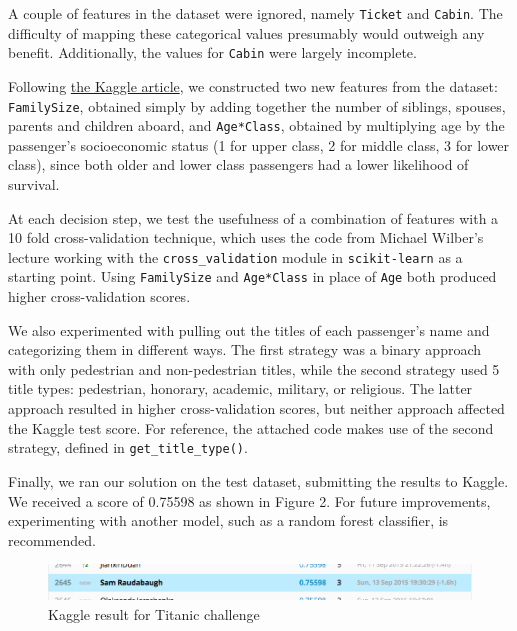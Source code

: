 \documentclass[12pt]{report}
\begin{document}
A couple of features in the dataset were ignored, namely \verb+Ticket+ and \verb+Cabin+. The difficulty of mapping these categorical values presumably would outweigh any
benefit. Additionally, the values for \verb+Cabin+ were largely incomplete.

Following \href{https://www.kaggle.com/c/titanic/details/getting-started-with-python-ii}{the Kaggle article}, we constructed two new features from the dataset:
\verb+FamilySize+, obtained simply by adding together the number of siblings, spouses, parents and children aboard, and \verb+Age*Class+, obtained by multiplying age by the passenger's
socioeconomic status (1 for upper class, 2 for middle class, 3 for lower class), since both older and lower class passengers had a lower likelihood of survival.

At each decision step, we test the usefulness of a combination of features with a 10 fold cross-validation technique, which uses the code from Michael Wilber's lecture working with the \verb+cross_validation+
module in \verb+scikit-learn+ as a starting point.
Using \verb+FamilySize+ and \verb+Age*Class+ in place of \verb+Age+ both produced higher cross-validation scores.

We also experimented with pulling out the titles of each passenger's name and categorizing them in different ways. The first strategy was a binary approach with only pedestrian and non-pedestrian titles,
while the second strategy used 5 title types: pedestrian, honorary, academic, military, or religious. The latter approach resulted in higher cross-validation scores, but neither approach affected the Kaggle test score.
For reference, the attached code makes use of the second strategy, defined in \verb+get_title_type()+.

Finally, we ran our solution on the test dataset, submitting the results to Kaggle. We received a score of 0.75598 as shown in Figure 2. For future improvements, experimenting with another model,
such as a random forest classifier, is recommended.
\begin{figure}
\centering
  \includegraphics[width=150mm]{figures/kaggle-titanic.png}
\caption{Kaggle result for Titanic challenge}
\end{figure}
\end{document}
